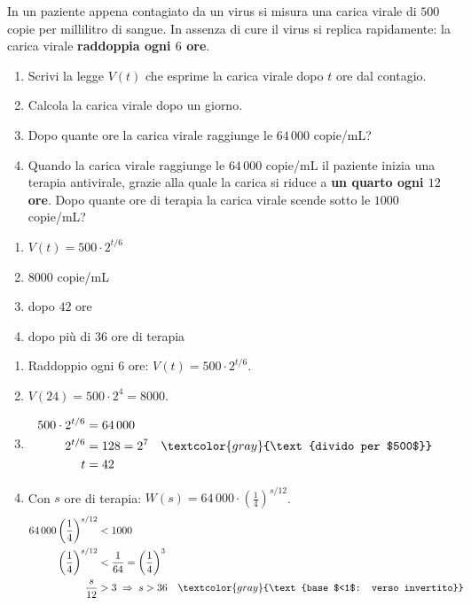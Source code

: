 
\begin{question}[ID=6.3, subtitle={Carica virale e terapia antivirale}, difficulty=difficile, tags={problemi, esponenziali, crescita, virus}]
In un paziente appena contagiato da un virus si misura una carica virale di $500$ copie per millilitro di sangue. In assenza di cure il virus si replica rapidamente: la carica virale \textbf{raddoppia ogni $6$ ore}.
\begin{enumerate}[label=\alph*),leftmargin=1.8cm]
    \item Scrivi la legge $V(t)$ che esprime la carica virale dopo $t$ ore dal contagio.
    \item Calcola la carica virale dopo un giorno.
    \item Dopo quante ore la carica virale raggiunge le $64\,000$ copie/mL?
    \item Quando la carica virale raggiunge le $64\,000$ copie/mL il paziente inizia una terapia antivirale, grazie alla quale la carica si riduce a \textbf{un quarto ogni $12$ ore}. Dopo quante ore di terapia la carica virale scende sotto le $1000$ copie/mL?
\end{enumerate}
\begin{solution}
\begin{enumerate}[label=\alph*),leftmargin=1.8cm]
    \item $V(t)=500\cdot2^{t/6}$
    \item $8000$ copie/mL
    \item dopo $42$ ore
    \item dopo più di $36$ ore di terapia
\end{enumerate}
\end{solution}
\begin{explanation}
\begin{enumerate}[label=\alph*),leftmargin=1.8cm]
    \item Raddoppio ogni $6$ ore: $V(t)=500\cdot2^{t/6}$.
    \item $V(24)=500\cdot2^4=8000$.
    \item \[\begin{aligned}
    500\cdot2^{t/6} &= 64\,000\\
    2^{t/6} &= 128=2^7 && \textcolor{gray}{\text{divido per $500$}}\\
    t &= 42
    \end{aligned}\]
    \item Con $s$ ore di terapia: $W(s)=64\,000\cdot\left(\tfrac14\right)^{s/12}$.
    \[\begin{aligned}
    64\,000\left(\dfrac14\right)^{s/12} &< 1000\\
    \left(\dfrac14\right)^{s/12} &< \dfrac1{64}=\left(\dfrac14\right)^3\\
    \dfrac{s}{12} &> 3 \;\Rightarrow\; s>36 && \textcolor{gray}{\text{base $<1$: verso invertito}}
    \end{aligned}\]
\end{enumerate}
\end{explanation}
\end{question}

